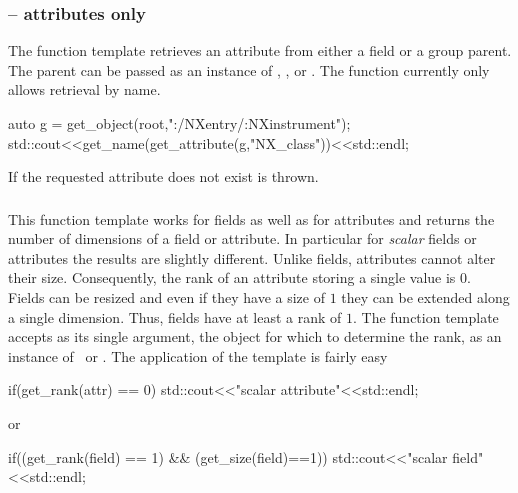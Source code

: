 \subsubsection{ -- attributes only}

The  function template retrieves an attribute from either a
field or a group parent. The parent can be passed as an instance of \nxobject, 
\nxfield, or \nxgroup. The function currently only allows retrieval by name. 
\begin{cppcode}
auto g = get_object(root,":/NXentry/:NXinstrument");
std::cout<<get_name(get_attribute(g,"NX_class"))<<std::endl;
\end{cppcode}
If the requested attribute does not exist  is thrown.

\subsubsection{}

This function template works for fields as well as for attributes and returns 
the number of dimensions of a field or attribute. In particular for
\emph{scalar} fields or attributes the results are slightly different. 
Unlike fields, attributes cannot alter their size. Consequently, the rank of an
attribute storing a single value is $0$. Fields can be resized and even if they
have a size of $1$ they can be extended along a single dimension. Thus, fields
have at least a rank of $1$. The function template accepts as its single 
argument, the object for which to determine the rank, as an instance of
\nxfield\ or \nxattribute. The application of the template is fairly 
easy
\begin{cppcode}
if(get_rank(attr) == 0)
    std::cout<<"scalar attribute"<<std::endl;
\end{cppcode}
or
\begin{cppcode}
if((get_rank(field) == 1) && (get_size(field)==1))
    std::cout<<"scalar field"<<std::endl;
\end{cppcode}

\subsubsection{}

